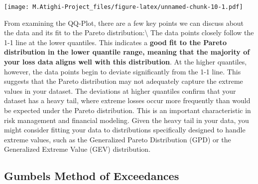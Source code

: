 \documentclass[
  12pt,
]{article}
\begin{document}
\texttt{[image: M.Atighi-Project\_files/figure-latex/unnamed-chunk-10-1.pdf]}

From examining the QQ-Plot, there are a few key points we can discuss
about the data and its fit to the Pareto distribution:\textbackslash{}
The data points closely follow the 1-1 line at the lower quantiles. This
indicates a
\textbf{good fit to the Pareto distribution in the lower quantile range, meaning that the majority of your loss data aligns well with this distribution}.
At the higher quantiles, however, the data points begin to deviate
significantly from the 1-1 line. This suggests that the Pareto
distribution may not adequately capture the extreme values in your
dataset. The deviations at higher quantiles confirm that your dataset
has a heavy tail, where extreme losses occur more frequently than would
be expected under the Pareto distribution. This is an important
characteristic in risk management and financial modeling. Given the
heavy tail in your data, you might consider fitting your data to
distributions specifically designed to handle extreme values, such as
the Generalized Pareto Distribution (GPD) or the Generalized Extreme
Value (GEV) distribution.

\subsection{Gumbels Method of
Exceedances}\label{gumbels-method-of-exceedances}
\end{document}
